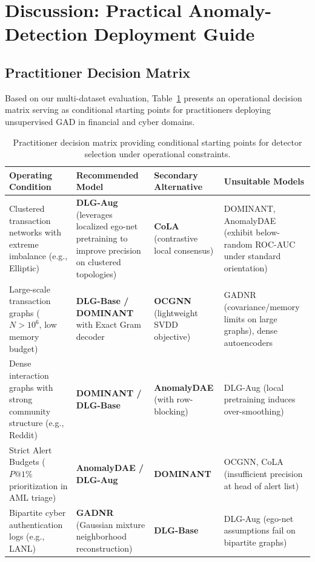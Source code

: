 \documentclass[11pt,a4paper]{article}
\begin{document}
\section{Discussion: Practical Anomaly-Detection Deployment Guide}
\label{sec:discussion}

\subsection{Practitioner Decision Matrix}
Based on our multi-dataset evaluation, Table~\ref{tab:decision_matrix} presents an operational decision matrix serving as conditional starting points for practitioners deploying unsupervised GAD in financial and cyber domains.

\begin{table}[htbp]
\centering\footnotesize\setlength{\tabcolsep}{4pt}
\caption{Practitioner decision matrix providing conditional starting points for detector selection under operational constraints.}
\label{tab:decision_matrix}
\begin{tabularx}{\textwidth}{>{\raggedright\arraybackslash}p{}>{\raggedright\arraybackslash}X>{\raggedright\arraybackslash}X>{\raggedright\arraybackslash}p{}}\toprule
\textbf{Operating Condition} & \textbf{Recommended Model} & \textbf{Secondary Alternative} & \textbf{Unsuitable Models} \\\midrule
Clustered transaction networks with extreme imbalance (e.g., Elliptic) & \textbf{DLG-Aug} (leverages localized ego-net pretraining to improve precision on clustered topologies) & \textbf{CoLA} (contrastive local consensus) & DOMINANT, AnomalyDAE (exhibit below-random ROC-AUC under standard orientation) \\
Large-scale transaction graphs ($N > 10^6$, low memory budget) & \textbf{DLG-Base / DOMINANT} with Exact Gram decoder & \textbf{OCGNN} (lightweight SVDD objective) & GADNR (covariance/memory limits on large graphs), dense autoencoders \\
Dense interaction graphs with strong community structure (e.g., Reddit) & \textbf{DOMINANT / DLG-Base} & \textbf{AnomalyDAE} (with row-blocking) & DLG-Aug (local pretraining induces over-smoothing) \\
Strict Alert Budgets ($P@1\%$ prioritization in AML triage) & \textbf{AnomalyDAE / DLG-Aug} & \textbf{DOMINANT} & OCGNN, CoLA (insufficient precision at head of alert list) \\
Bipartite cyber authentication logs (e.g., LANL) & \textbf{GADNR} (Gaussian mixture neighborhood reconstruction) & \textbf{DLG-Base} & DLG-Aug (ego-net assumptions fail on bipartite graphs) \\\bottomrule
\end{tabularx}
\end{table}
\end{document}
